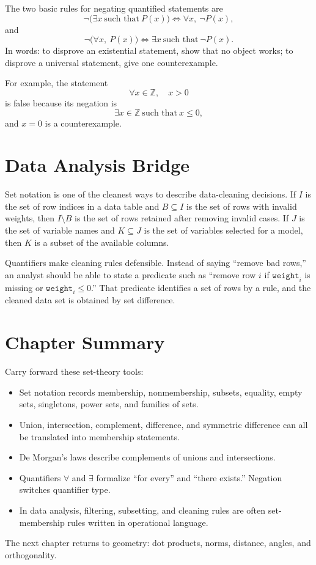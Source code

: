 The two basic rules for negating quantified statements are
\[
    \neg\bigl(\exists x\ \text{such that}\ P(x)\bigr)
    \Longleftrightarrow
    \forall x,\ \neg P(x),
\]
and
\[
    \neg\bigl(\forall x,\ P(x)\bigr)
    \Longleftrightarrow
    \exists x\ \text{such that}\ \neg P(x).
\]
In words: to disprove an existential statement, show that no object works; to disprove a universal statement, give one counterexample.

For example, the statement
\[
    \forall x\in\mathbb{Z},\quad x>0
\]
is false because its negation is
\[
    \exists x\in\mathbb{Z}\ \text{such that}\ x\leq 0,
\]
and \(x=0\) is a counterexample.

\section{Data Analysis Bridge}
\label{mf:ch04-data-analysis-bridge}

Set notation is one of the cleanest ways to describe data-cleaning decisions. If \(I\) is the set of row indices in a data table and \(B\subseteq I\) is the set of rows with invalid weights, then \(I\setminus B\) is the set of rows retained after removing invalid cases. If \(J\) is the set of variable names and \(K\subseteq J\) is the set of variables selected for a model, then \(K\) is a subset of the available columns.

Quantifiers make cleaning rules defensible. Instead of saying ``remove bad rows,'' an analyst should be able to state a predicate such as ``remove row \(i\) if \(\texttt{weight}_i\) is missing or \(\texttt{weight}_i\leq 0\).'' That predicate identifies a set of rows by a rule, and the cleaned data set is obtained by set difference.

\section{Chapter Summary}
\label{mf:ch04-summary}
\label{mf:set-operations-summary}

Carry forward these set-theory tools:
\begin{itemize}
    \item Set notation records membership, nonmembership, subsets, equality, empty sets, singletons, power sets, and families of sets.
    \item Union, intersection, complement, difference, and symmetric difference can all be translated into membership statements.
    \item De Morgan's laws describe complements of unions and intersections.
    \item Quantifiers \(\forall\) and \(\exists\) formalize ``for every'' and ``there exists.'' Negation switches quantifier type.
    \item In data analysis, filtering, subsetting, and cleaning rules are often set-membership rules written in operational language.
\end{itemize}

The next chapter returns to geometry: dot products, norms, distance, angles, and orthogonality.
